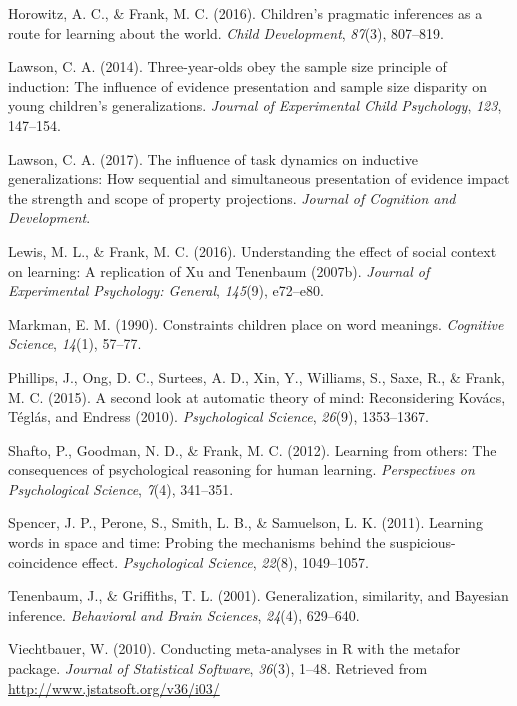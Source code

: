 \documentclass[english,floatsintext,man]{apa6}
\theoremstyle{definition}
\theoremstyle{definition}
\theoremstyle{definition}
\theoremstyle{remark}
\begin{document}
\hypertarget{ref-horowitz2016}{}
Horowitz, A. C., \& Frank, M. C. (2016). Children's pragmatic inferences
as a route for learning about the world. \emph{Child Development},
\emph{87}(3), 807--819.

\hypertarget{ref-lawson2014three}{}
Lawson, C. A. (2014). Three-year-olds obey the sample size principle of
induction: The influence of evidence presentation and sample size
disparity on young children's generalizations. \emph{Journal of
Experimental Child Psychology}, \emph{123}, 147--154.

\hypertarget{ref-lawson2017influence}{}
Lawson, C. A. (2017). The influence of task dynamics on inductive
generalizations: How sequential and simultaneous presentation of
evidence impact the strength and scope of property projections.
\emph{Journal of Cognition and Development}.

\hypertarget{ref-lewis2016understanding}{}
Lewis, M. L., \& Frank, M. C. (2016). Understanding the effect of social
context on learning: A replication of Xu and Tenenbaum (2007b).
\emph{Journal of Experimental Psychology: General}, \emph{145}(9),
e72--e80.

\hypertarget{ref-markman1990constraints}{}
Markman, E. M. (1990). Constraints children place on word meanings.
\emph{Cognitive Science}, \emph{14}(1), 57--77.

\hypertarget{ref-phillips2015second}{}
Phillips, J., Ong, D. C., Surtees, A. D., Xin, Y., Williams, S., Saxe,
R., \& Frank, M. C. (2015). A second look at automatic theory of mind:
Reconsidering Kovács, Téglás, and Endress (2010). \emph{Psychological
Science}, \emph{26}(9), 1353--1367.

\hypertarget{ref-shafto2012}{}
Shafto, P., Goodman, N. D., \& Frank, M. C. (2012). Learning from
others: The consequences of psychological reasoning for human learning.
\emph{Perspectives on Psychological Science}, \emph{7}(4), 341--351.

\hypertarget{ref-spencer2011learning}{}
Spencer, J. P., Perone, S., Smith, L. B., \& Samuelson, L. K. (2011).
Learning words in space and time: Probing the mechanisms behind the
suspicious-coincidence effect. \emph{Psychological Science},
\emph{22}(8), 1049--1057.

\hypertarget{ref-tenenbaum2001}{}
Tenenbaum, J., \& Griffiths, T. L. (2001). Generalization, similarity,
and Bayesian inference. \emph{Behavioral and Brain Sciences},
\emph{24}(4), 629--640.

\hypertarget{ref-R-metafor}{}
Viechtbauer, W. (2010). Conducting meta-analyses in R with the metafor
package. \emph{Journal of Statistical Software}, \emph{36}(3), 1--48.
Retrieved from \url{http://www.jstatsoft.org/v36/i03/}
\end{document}

